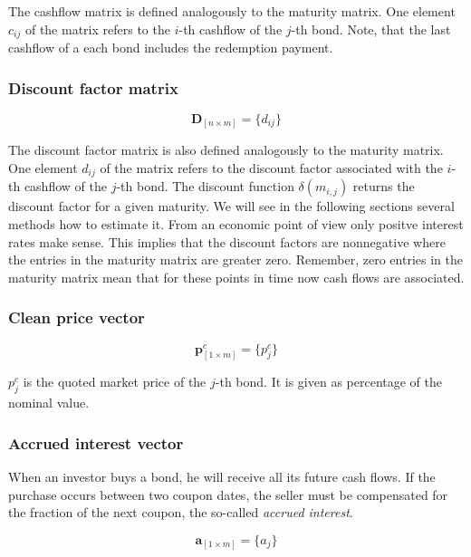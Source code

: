  The cashflow matrix is defined analogously to the maturity matrix.  One element $c_{ij}$  of the matrix refers to the $i$-th cashflow of the $j$-th bond. Note, that the last cashflow of a each bond includes the redemption payment.

\subsubsection*{Discount factor matrix}

 \begin{equation}\label{discountm}
\bm{D}_{\left[n\times m\right]}= \{d_{ij}\}
\end{equation}

The discount factor matrix is also defined analogously to the maturity matrix. One element $d_{ij}$ of the matrix refers to the discount factor associated with  the $i$-th cashflow of the $j$-th bond. The discount function $\delta(m_{i,j})$ returns the discount factor for a given maturity. We will see in the following sections several methods how to estimate it. From an economic point of view only positve interest rates make sense. This implies that the discount factors are nonnegative where the entries in the maturity matrix are greater zero. Remember, zero entries in the maturity matrix mean that for these points in time now cash flows are associated.

\subsubsection*{Clean price vector}

 \begin{equation}\label{pc}
\bm{p}^c_{\left[1\times m\right]}= \{p^c_j\}
\end{equation}

$p_{j}^c$ is the quoted market price of the $j$-th bond. It is given as percentage of the nominal value.

\subsubsection*{Accrued interest vector}

When an investor buys a bond, he will receive all its future cash flows. If the purchase occurs between two coupon dates, the seller must be compensated for the fraction of the next coupon, the so-called \emph{accrued interest}.

  \begin{equation}\label{a}
\bm{a}_{\left[1\times m\right]}= \{a_j\}
\end{equation}



